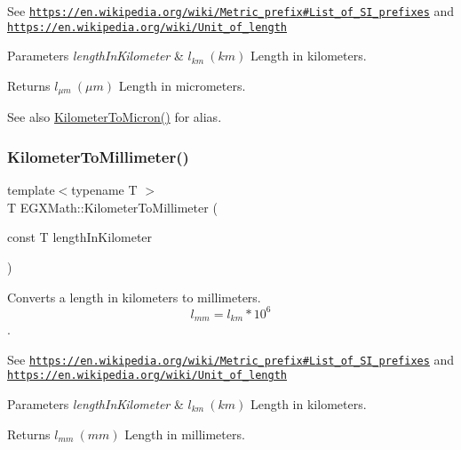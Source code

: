 See \href{https://en.wikipedia.org/wiki/Metric_prefix#List_of_SI_prefixes}{\tt https\+://en.\+wikipedia.\+org/wiki/\+Metric\+\_\+prefix\#\+List\+\_\+of\+\_\+\+S\+I\+\_\+prefixes} and \href{https://en.wikipedia.org/wiki/Unit_of_length}{\tt https\+://en.\+wikipedia.\+org/wiki/\+Unit\+\_\+of\+\_\+length} 
\begin{DoxyParams}{Parameters}
{\em length\+In\+Kilometer} & $ l_{km}\ (km)$ Length in kilometers. \\
\hline
\end{DoxyParams}
\begin{DoxyReturn}{Returns}
$ l_{\mu m}\ (\mu m)$ Length in micrometers. 
\end{DoxyReturn}
\begin{DoxySeeAlso}{See also}
\mbox{\hyperlink{group___e_g_x_math-_conversions-_length_conversions-_s_i-_kilometer-_non-_s_i_gae662bafe0d1fc36276a336fd969307a0}{Kilometer\+To\+Micron()}} for alias. 
\end{DoxySeeAlso}
\mbox{\label{group___e_g_x_math-_conversions-_length_conversions-_s_i-_kilometer-_s_i_ga109bb9ca348173d3bfd643a4e3bd3686}} 
\subsubsection{\texorpdfstring{Kilometer\+To\+Millimeter()}{KilometerToMillimeter()}}
{\footnotesize\ttfamily template$<$typename T $>$ \\
T E\+G\+X\+Math\+::\+Kilometer\+To\+Millimeter (\begin{DoxyParamCaption}\item[{const T}]{length\+In\+Kilometer }\end{DoxyParamCaption})}



Converts a length in kilometers to millimeters. \[ l_{mm}=l_{km} * 10^{6} \]. 

See \href{https://en.wikipedia.org/wiki/Metric_prefix#List_of_SI_prefixes}{\tt https\+://en.\+wikipedia.\+org/wiki/\+Metric\+\_\+prefix\#\+List\+\_\+of\+\_\+\+S\+I\+\_\+prefixes} and \href{https://en.wikipedia.org/wiki/Unit_of_length}{\tt https\+://en.\+wikipedia.\+org/wiki/\+Unit\+\_\+of\+\_\+length} 
\begin{DoxyParams}{Parameters}
{\em length\+In\+Kilometer} & $ l_{km}\ (km)$ Length in kilometers. \\
\hline
\end{DoxyParams}
\begin{DoxyReturn}{Returns}
$ l_{mm}\ (mm)$ Length in millimeters. 
\end{DoxyReturn}
\mbox{\label{group___e_g_x_math-_conversions-_length_conversions-_s_i-_kilometer-_s_i_gaa2272319841906222fd95dc1c3e90549}} 
